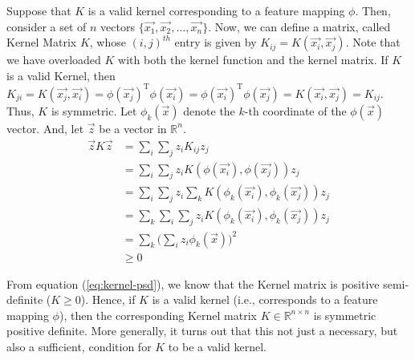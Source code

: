 Suppose that $K$ is a valid kernel corresponding to a feature mapping $\phi$. Then, consider a set of $n$ vectors $\{\vec{x_1}, \vec{x_2}, \dots, \vec{x_n}\}$. Now, we can define a matrix, called Kernel Matrix $K$, whose $(i,j)^{th}$ entry is given by $K_{ij} = K(\vec{x_i}, \vec{x_j})$. Note that we have overloaded $K$ with both the kernel function and the kernel matrix.
If $K$ is a valid Kernel, then $K_{ji} = K(\vec{x_j}, \vec{x_i}) = \phi(\vec{x_j})^{\text{T}}\phi(\vec{x_i}) = \phi(\vec{x_i})^{\text{T}}\phi(\vec{x_j}) = K(\vec{x_i}, \vec{x_j}) = K_{ij}$. Thus, $K$ is symmetric. Let $\phi_k(\vec{x})$ denote the $k$-th coordinate of the $\phi(\vec{x})$ vector. And, let $\vec{z}$ be a vector in $\mathbb{R}^n$.
\begin{align}
	\vec{z}K\vec{z} &= \sum_{i}\sum_{j} z_{i}K_{ij}z_{j} \nonumber \\
&= \sum_{i}\sum_{j} z_{i}K(\phi(\vec{x_i}), \phi(\vec{x_j}))z_{j} \nonumber \\
&= \sum_{i}\sum_{j} z_{i}\sum_{k} K(\phi_k(\vec{x_i}), \phi_k(\vec{x_j}))z_{j} \nonumber \\
&= \sum_{k}\sum_{i}\sum_{j} z_{i}K(\phi_k(\vec{x_i}), \phi_k(\vec{x_j}))z_{j} \nonumber \\
&= \sum_{k} \Bigg(\sum_{i} z_i\phi_{k}(\vec{x})\Bigg)^2 \nonumber \\
&\geq 0 \label{eq:kernel-psd}
\end{align}

From equation (\ref{eq:kernel-psd}), we know that the Kernel matrix is positive semi-definite ($K \geq 0$). Hence, if $K$ is a valid kernel (i.e., corresponds to a feature mapping $\phi$), then the corresponding Kernel matrix $K \in \mathbb{R}^{n\times n}$ is symmetric positive definite. More generally, it turns out that this not just a necessary, but also a sufficient, condition for $K$ to be a valid kernel.  